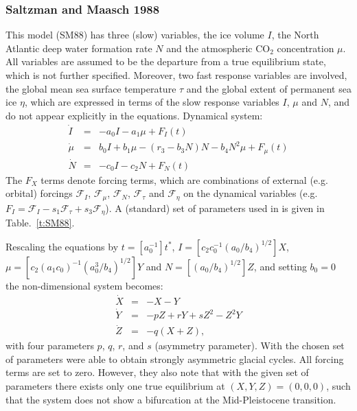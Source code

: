 \documentclass[12pt]{article}
\def\ba{\begin{eqnarray}}
\def\ea{\end{eqnarray}}
\begin{document}

\subsubsection{Saltzman and Maasch 1988}
This model \cite{Saltzman:1988tv} (SM88) has three (slow) variables, the ice volume $I$, the North Atlantic deep water formation rate $N$ and the atmospheric CO$_2$ concentration $\mu$. All variables are assumed to be the departure from a true equilibrium state, which is not further specified. Moreover, two fast response variables are involved, the global mean sea surface temperature $\tau$ and the global extent of permanent sea ice $\eta$, which are expressed in terms of the slow response variables $I$, $\mu$ and $N$, and do not appear explicitly in the equations. 
Dynamical system:
\ba
\dot I &=& -a_0 I - a_1 \mu + F_I(t)\\
\dot \mu &=& b_0 I + b_1 \mu -(r_3 - b_3 N) N - b_4 N^2 \mu + F_\mu(t)\\
\dot N &=& -c_0 I -c_2 N + F_N(t)
\label{e:SM88full}
\ea
The $F_X$ terms denote forcing terms, which are combinations of external (e.g. orbital) forcings $\mathcal{F}_I$, $\mathcal{F}_\mu$, $\mathcal{F}_N$, $\mathcal{F}_\tau$ and $\mathcal{F}_\eta$  on the dynamical variables (e.g. $F_I = \mathcal{F}_I-s_1\mathcal{F}_\tau+s_3\mathcal{F}_\eta$). A (standard) set of parameters used in \cite{Saltzman:1988tv} is given in Table.~\ref{t:SM88}. 

Rescaling the equations by $t = [a_0^{-1}]t^*$, $I=[c_2c_0^{-1}(a_0/b_4)^{1/2}]X$, $\mu = [c_2(a_1c_0)^{-1}(a_0^3/b_4)^{1/2}]Y$ and $N = [(a_0/b_4)^{1/2}]Z$, and setting $b_0 =0$ the non-dimensional system becomes:
\ba
\dot X &=& -X -Y\\
\dot Y &=& -pZ + rY +sZ^2 -Z^2 Y\\
\dot Z &=& -q(X+Z),
\label{e:SM88nondim}
\ea
with four parameters $p$, $q$, $r$, and $s$ (asymmetry parameter). With the chosen set of parameters \cite{Saltzman:1988tv} were able to obtain strongly asymmetric glacial cycles. All forcing terms are set to zero. However, they also note that with the given set of parameters there exists only one true equilibrium at $(X,Y,Z) = (0,0,0)$, such that the system does not show a bifurcation at the Mid-Pleistocene transition. 
\end{document}
